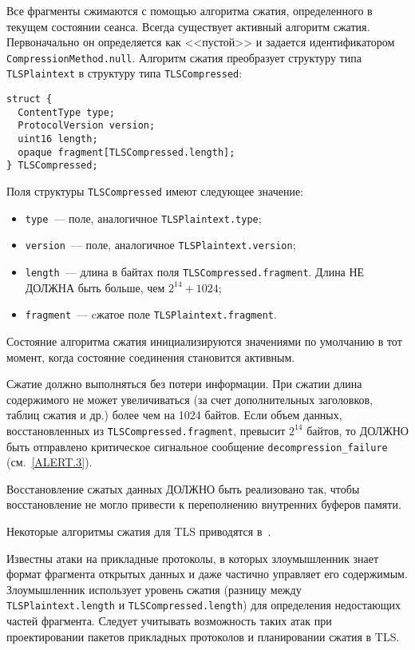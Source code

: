Все фрагменты сжимаются с помощью алгоритма сжатия, определенного в 
текущем состоянии сеанса. Всегда существует активный алгоритм сжатия. 
Первоначально он определяется как <<пустой>> и задается идентификатором 
\lstinline{CompressionMethod.null}.  
Алгоритм сжатия преобразует структуру типа \lstinline{TLSPlaintext} в 
структуру типа \lstinline{TLSCompressed}:
\begin{lstlisting}
struct {
  ContentType type;
  ProtocolVersion version;
  uint16 length;
  opaque fragment[TLSCompressed.length];
} TLSCompressed;
\end{lstlisting}

Поля структуры \lstinline{TLSCompressed} имеют следующее значение:
\begin{itemize}
\item[--]
\lstinline{type}~--- поле, аналогичное \lstinline{TLSPlaintext.type};

\item[--]
\lstinline{version}~--- поле, аналогичное \lstinline{TLSPlaintext.version};

\item[--]
\lstinline{length}~--- длина в байтах поля 
\lstinline{TLSCompressed.fragment}. Длина НЕ ДОЛЖНА быть больше, чем 
$2^{14} + 1024$; 
\item[--]
\lstinline{fragment}~--- cжатое поле \lstinline{TLSPlaintext.fragment}.
\end{itemize}

Состояние алгоритма сжатия инициализируются значениями по умолчанию в тот 
момент, когда состояние соединения становится активным. 

Сжатие должно выполняться без потери информации. При сжатии длина 
содержимого не может увеличиваться (за счет дополнительных заголовков, 
таблиц сжатия и др.) более чем на 1024 байтов. Если объем данных, 
восстановленных из \lstinline{TLSCompressed.fragment}, превысит $2^{14}$ 
байтов, то ДОЛЖНО быть отправлено критическое сигнальное сообщение 
\lstinline{decompression_failure} (см.~\ref{ALERT.3}). 

Восстановление сжатых данных ДОЛЖНО быть реализовано так, чтобы 
восстановление не могло привести к переполнению внутренних буферов памяти. 

\begin{note}
Некоторые алгоритмы сжатия для TLS приводятся в~\cite{RFC3749}. 
\end{note}

\begin{note}
Известны атаки на прикладные протоколы, в которых 
злоумышленник знает формат фрагмента открытых данных и даже частично 
управляет его содержимым. Злоумышленник использует уровень сжатия (разницу 
между \lstinline{TLSPlaintext.length} и \lstinline{TLSCompressed.length}) 
для определения недостающих частей фрагмента. Следует учитывать 
возможность таких атак при проектировании пакетов прикладных протоколов и 
планировании сжатия в TLS. 
\end{note}
 
